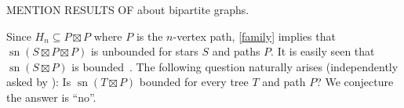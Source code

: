 \documentclass[kpfonts]{patmorin}
\DeclareMathOperator{\sn}{sn}
\begin{document}
MENTION RESULTS OF \citet{Pupyrev20} about bipartite graphs.

Since $H_n\subseteq P \boxtimes P$ where $P$ is the $n$-vertex path, \cref{family} implies that $\sn(S\boxtimes P\boxtimes P)$ is unbounded for stars $S$ and paths $P$. It is easily seen that $\sn(S\boxtimes P)$ is bounded~\citep{Pupyrev20}. The following question naturally arises (independently asked by \citet{Pupyrev20}):
Is $\sn(T \boxtimes P)$ bounded for every tree $T$ and path $P$? We conjecture the answer is ``no''.

\let\oldthebibliography=\thebibliography
\let\endoldthebibliography=\endthebibliography
\renewenvironment{thebibliography}[1]{%
\begin{oldthebibliography}{#1}%
\setlength{\parskip}{0ex}%
\setlength{\itemsep}{0ex}%
}{\end{oldthebibliography}}

%




\end{document}
